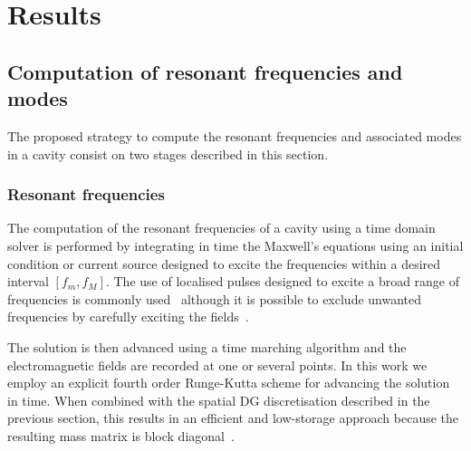 \label{Chapter6}
\chapter{Results}
\section{Computation of resonant frequencies and modes}
\label{sc:FrequenciesAndModes}

The proposed strategy to compute the resonant frequencies and associated modes in a cavity consist on two stages described in this section. 

\subsection{Resonant frequencies}
\label{sc:frequencies}
The computation of the resonant frequencies of a cavity using a time domain solver is performed by integrating in time the Maxwell's equations using an initial condition or current source designed to excite the frequencies within a desired interval $[f_m, f_M]$. The use of localised pulses designed to excite a broad range of frequencies is commonly used~\cite{guo2001computation,taflove2013advances,dantanarayana2014resonant} although it is possible to exclude unwanted frequencies by carefully exciting the fields~\cite{werner2008extracting}.

The solution is then advanced using a time marching algorithm and the electromagnetic fields are recorded at one or several points. In this work we employ an explicit fourth order Runge-Kutta scheme for advancing the solution in time. When combined with the spatial DG discretisation described in the previous section, this results in an efficient and low-storage approach because the resulting mass matrix is block diagonal~\cite{HybridMeshesCEM}. 

